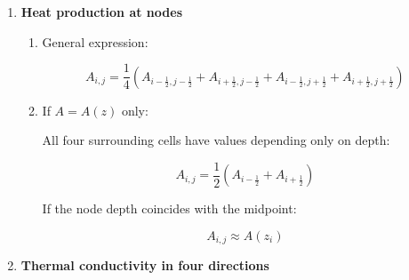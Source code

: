 \documentclass[final,a4paper,12pt]{article}
\newcommand{\half}{\tfrac{1}{2}}
\begin{document}
\begin{enumerate}
Using fluxes across cell faces:

\begin{align}
&\frac{1}{\Delta x^2}
\left[
k_{i+\half,j}(T_{i+1,j} - T_{i,j})
-
k_{i-\half,j}(T_{i,j} - T_{i-1,j})
\right] \\
+ &\frac{1}{\Delta z^2}
\left[
k_{i,j+\half}(T_{i,j+1} - T_{i,j})
-
k_{i,j-\half}(T_{i,j} - T_{i,j-1})
\right]
+ A_{i,j} = 0
\end{align}

Rearranged:

\begin{equation}
T_{i,j} =
\frac{
k_{i+\half,j}T_{i+1,j}/\Delta x^2 +
k_{i-\half,j}T_{i-1,j}/\Delta x^2 +
k_{i,j+\half}T_{i,j+1}/\Delta z^2 +
k_{i,j-\half}T_{i,j-1}/\Delta z^2
+ A_{i,j}
}{
k_{i+\half,j}/\Delta x^2 +
k_{i-\half,j}/\Delta x^2 +
k_{i,j+\half}/\Delta z^2 +
k_{i,j-\half}/\Delta z^2
}
\end{equation}

\item \textbf{Heat production at nodes}

\begin{enumerate}

\item General expression:

\begin{equation}
A_{i,j} = \frac{1}{4} \left(
A_{i-\half,j-\half} +
A_{i+\half,j-\half} +
A_{i-\half,j+\half} +
A_{i+\half,j+\half}
\right)
\end{equation}

\item If $A = A(z)$ only:

All four surrounding cells have values depending only on depth:

\begin{equation}
A_{i,j} = \frac{1}{2} (A_{i-\half} + A_{i+\half})
\end{equation}

If the node depth coincides with the midpoint:

\begin{equation}
A_{i,j} \approx A(z_i)
\end{equation}

\end{enumerate}

\item \textbf{Thermal conductivity in four directions}


\end{enumerate}
\end{document}

